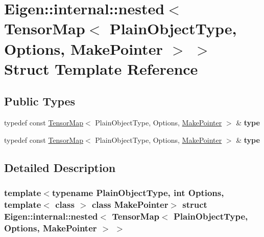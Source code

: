 \hypertarget{struct_eigen_1_1internal_1_1nested_3_01_tensor_map_3_01_plain_object_type_00_01_options_00_01_make_pointer_01_4_01_4}{}\section{Eigen\+:\+:internal\+:\+:nested$<$ Tensor\+Map$<$ Plain\+Object\+Type, Options, Make\+Pointer $>$ $>$ Struct Template Reference}
\label{struct_eigen_1_1internal_1_1nested_3_01_tensor_map_3_01_plain_object_type_00_01_options_00_01_make_pointer_01_4_01_4}
\subsection*{Public Types}
\begin{DoxyCompactItemize}
\item 
\mbox{\label{struct_eigen_1_1internal_1_1nested_3_01_tensor_map_3_01_plain_object_type_00_01_options_00_01_make_pointer_01_4_01_4_adb48e61f96a990e748de51e90a137d7d}} 
typedef const \hyperlink{class_eigen_1_1_tensor_map}{Tensor\+Map}$<$ Plain\+Object\+Type, Options, \hyperlink{struct_eigen_1_1_make_pointer}{Make\+Pointer} $>$ \& {\bfseries type}
\item 
\mbox{\label{struct_eigen_1_1internal_1_1nested_3_01_tensor_map_3_01_plain_object_type_00_01_options_00_01_make_pointer_01_4_01_4_adb48e61f96a990e748de51e90a137d7d}} 
typedef const \hyperlink{class_eigen_1_1_tensor_map}{Tensor\+Map}$<$ Plain\+Object\+Type, Options, \hyperlink{struct_eigen_1_1_make_pointer}{Make\+Pointer} $>$ \& {\bfseries type}
\end{DoxyCompactItemize}


\subsection{Detailed Description}
\subsubsection*{template$<$typename Plain\+Object\+Type, int Options, template$<$ class $>$ class Make\+Pointer$>$\newline
struct Eigen\+::internal\+::nested$<$ Tensor\+Map$<$ Plain\+Object\+Type, Options, Make\+Pointer $>$ $>$}



